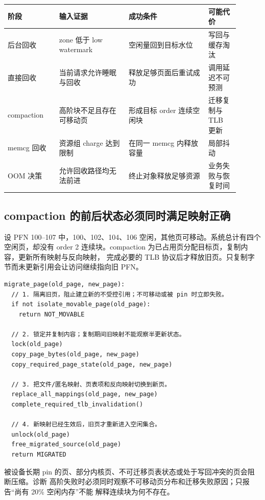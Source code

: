 \begin{longtable}{|L{0.2\linewidth}|L{0.27\linewidth}|L{0.31\linewidth}|L{0.12\linewidth}|}
\hline
阶段 & 输入证据 & 成功条件 & 可能代价 \\ \hline
后台回收 & zone 低于 low watermark & 空闲量回到目标水位 & 写回与缓存淘汰 \\\tablerowrule
直接回收 & 当前请求允许睡眠与回收 & 释放足够页面后重试成功 & 调用延迟不可预测 \\\tablerowrule
compaction & 高阶块不足且存在可移动页 & 形成目标 order 连续空闲块 & 迁移复制与 TLB 更新 \\\tablerowrule
memcg 回收 & 资源组 charge 达到限制 & 在同一 memcg 内释放容量 & 局部抖动 \\\tablerowrule
OOM 决策 & 允许回收路径均无法前进 & 终止对象释放足够资源 & 业务失败与恢复时间 \\
\hline
\end{longtable}

\subsection{compaction 的前后状态必须同时满足映射正确}

设 PFN 100--107 中，100、102、104、106 空闲，其他页可移动。系统总计有四个空闲页，却没有
order 2 连续块。compaction 为已占用页分配目标页，复制内容，更新所有映射与反向映射，
完成必要的 TLB 协议后才释放旧页。只复制字节而未更新引用会让访问继续指向旧 PFN。

\begin{lstlisting}
migrate_page(old_page, new_page):
  // 1. 隔离旧页，阻止建立新的不受控引用；不可移动或被 pin 时立即失败。
  if not isolate_movable_page(old_page):
    return NOT_MOVABLE

  // 2. 锁定并复制内容；复制期间旧映射不能观察半更新状态。
  lock(old_page)
  copy_page_bytes(old_page, new_page)
  copy_required_page_state(old_page, new_page)

  // 3. 把文件/匿名映射、页表项和反向映射切换到新页。
  replace_all_mappings(old_page, new_page)
  complete_required_tlb_invalidation()

  // 4. 新映射已经生效后，旧页才重新进入空闲集合。
  unlock(old_page)
  free_migrated_source(old_page)
  return MIGRATED
\end{lstlisting}

被设备长期 pin 的页、部分内核页、不可迁移页表状态或处于写回冲突的页会阻断压缩。诊断
高阶失败时必须同时观察不可移动页分布和迁移失败原因；只报告“尚有 20\% 空闲内存”不能
解释连续块为何不存在。

